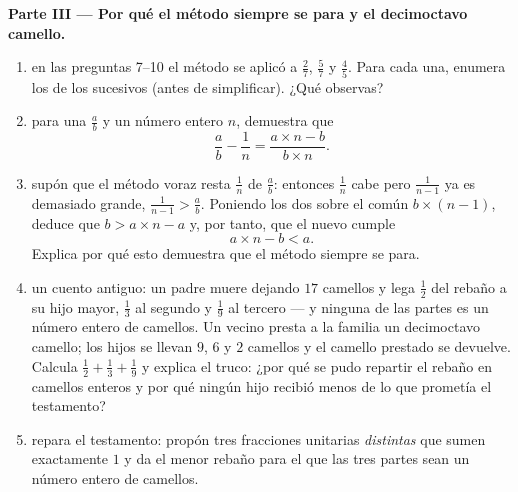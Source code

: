 \begin{problem}
\medskip
\noindent\textbf{Parte III --- Por qué el método siempre se para y el
decimoctavo camello.}
\begin{enumerate}[resume]
  \item en las preguntas 7--10 el método se aplicó a $\frac27$,
        $\frac57$ y $\frac45$. Para cada una, enumera los  de
        los  sucesivos (antes de simplificar).
        ¿Qué observas?
  \item para una  $\frac ab$ y un número entero $n$, demuestra
        que
        \[
        \frac{a}{b} - \frac{1}{n}
        = \frac{a \times n - b}{b \times n} .
        \]
  \item supón que el método voraz resta $\frac1n$ de
        $\frac ab$: entonces $\frac1n$ cabe pero $\frac{1}{n-1}$ ya
        es demasiado grande, $\frac{1}{n-1} > \frac ab$. Poniendo los dos
        sobre el  común $b \times (n - 1)$, deduce
        que $b > a \times n - a$ y, por tanto, que el nuevo 
        cumple
        \[
        a \times n - b < a .
        \]
        Explica por qué esto demuestra que el método siempre se para.
  \item un cuento antiguo: un padre muere dejando $17$ camellos y lega
        $\frac12$ del rebaño a su hijo mayor, $\frac13$ al
        segundo y $\frac19$ al tercero --- y ninguna de las
        partes es un número entero de camellos. Un vecino presta a la
        familia un decimoctavo camello; los hijos se llevan $9$, $6$ y
        $2$ camellos y el camello prestado se devuelve. Calcula
        $\frac12 + \frac13 + \frac19$ y explica el truco: ¿por qué
        se pudo repartir el rebaño en camellos enteros y por qué ningún
        hijo recibió menos de lo que prometía el testamento?
  \item repara el testamento: propón tres fracciones unitarias
        \emph{distintas} que sumen exactamente $1$ y da el
        menor rebaño para el que las tres partes sean un número
        entero de camellos.
\end{enumerate}
\end{problem}
